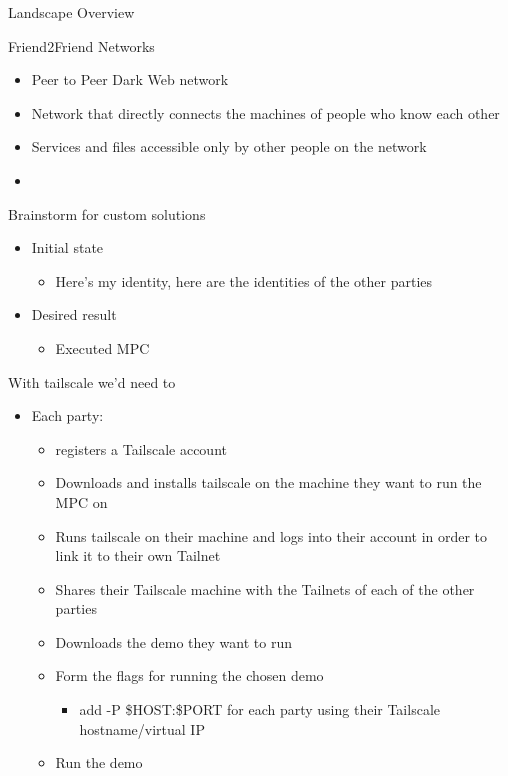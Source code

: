 \begin{frame}[fragile]{Landscape Overview}
\begin{block}{Friend2Friend Networks}
\protect\hypertarget{friend2friend-networks}{}
\begin{itemize}
\tightlist
\item
  Peer to Peer Dark Web network
\item
  Network that directly connects the machines of people who know each
  other
\item
  Services and files accessible only by other people on the network
\item
\end{itemize}
\end{block}
\end{frame}

\begin{frame}{Brainstorm for custom solutions}
\protect\hypertarget{brainstorm-for-custom-solutions}{}
\begin{itemize}
\tightlist
\item
  Initial state

  \begin{itemize}
  \tightlist
  \item
    Here's my identity, here are the identities of the other parties
  \end{itemize}
\item
  Desired result

  \begin{itemize}
  \tightlist
  \item
    Executed MPC
  \end{itemize}
\end{itemize}

With tailscale we'd need to

\begin{itemize}
\tightlist
\item
  Each party:

  \begin{itemize}
  \tightlist
  \item
    registers a Tailscale account
  \item
    Downloads and installs tailscale on the machine they want to run the
    MPC on
  \item
    Runs tailscale on their machine and logs into their account in order
    to link it to their own Tailnet
  \item
    Shares their Tailscale machine with the Tailnets of each of the
    other parties
  \item
    Downloads the demo they want to run
  \item
    Form the flags for running the chosen demo

    \begin{itemize}
    \tightlist
    \item
      add -P \$HOST:\$PORT for each party using their Tailscale
      hostname/virtual IP
    \end{itemize}
  \item
    Run the demo
  \end{itemize}
\end{itemize}
\end{frame}

